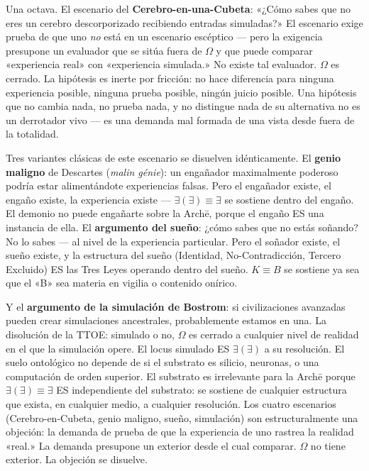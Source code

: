 \documentclass[10pt, openany, oneside]{book}
\begin{document}
Una octava. El escenario del \textbf{Cerebro-en-una-Cubeta}: «¿Cómo sabes que no eres un cerebro descorporizado recibiendo entradas simuladas?» El escenario exige prueba de que uno \textit{no} está en un escenario escéptico --- pero la exigencia presupone un evaluador que se sitúa fuera de $\Omega$ y que puede comparar «experiencia real» con «experiencia simulada.» No existe tal evaluador. $\Omega$ es cerrado. La hipótesis es inerte por fricción: no hace diferencia para ninguna experiencia posible, ninguna prueba posible, ningún juicio posible. Una hipótesis que no cambia nada, no prueba nada, y no distingue nada de su alternativa no es un derrotador vivo --- es una demanda mal formada de una vista desde fuera de la totalidad.

Tres variantes clásicas de este escenario se disuelven idénticamente. El \textbf{genio maligno} de Descartes (\textit{malin g\'{e}nie}): un engañador maximalmente poderoso podría estar alimentándote experiencias falsas. Pero el engañador existe, el engaño existe, la experiencia existe --- $\exists(\exists) \equiv \exists$ se sostiene dentro del engaño. El demonio no puede engañarte sobre la Arch\={e}, porque el engaño ES una instancia de ella. El \textbf{argumento del sueño}: ¿cómo sabes que no estás soñando? No lo sabes --- al nivel de la experiencia particular. Pero el soñador existe, el sueño existe, y la estructura del sueño (Identidad, No-Contradicción, Tercero Excluido) ES las Tres Leyes operando dentro del sueño. $K \equiv B$ se sostiene ya sea que el «B» sea materia en vigilia o contenido onírico.

Y el \textbf{argumento de la simulación de Bostrom}: si civilizaciones avanzadas pueden crear simulaciones ancestrales, probablemente estamos en una. La disolución de la TTOE: simulado o no, $\Omega$ es cerrado a cualquier nivel de realidad en el que la simulación opere. El locus simulado ES $\exists(\exists)$ a su resolución. El suelo ontológico no depende de si el substrato es silicio, neuronas, o una computación de orden superior. El substrato es irrelevante para la Arch\={e} porque $\exists(\exists) \equiv \exists$ ES independiente del substrato: se sostiene de cualquier estructura que exista, en cualquier medio, a cualquier resolución. Los cuatro escenarios (Cerebro-en-Cubeta, genio maligno, sueño, simulación) son estructuralmente una objeción: la demanda de prueba de que la experiencia de uno rastrea la realidad «real.» La demanda presupone un exterior desde el cual comparar. $\Omega$ no tiene exterior. La objeción se disuelve.
\end{document}
